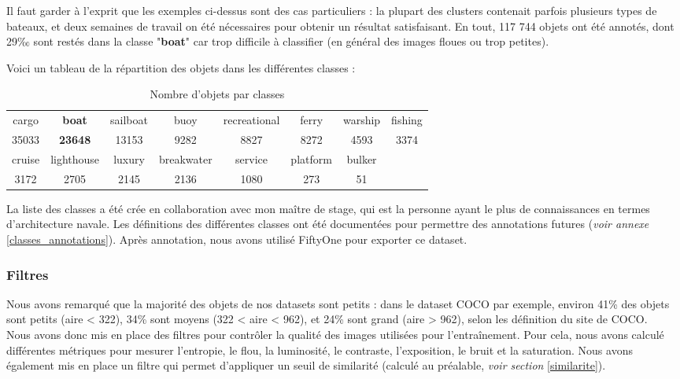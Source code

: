 Il faut garder à l'exprit que les exemples ci-dessus sont des cas particuliers : la plupart des
clusters contenait parfois plusieurs types de bateaux, et deux semaines de travail on été nécessaires
pour obtenir un résultat satisfaisant. En tout, 117 744 objets ont été annotés, dont 29‰ sont restés
dans la classe "\textbf{boat}" car trop difficile à classifier (en général des images floues ou trop petites).

Voici un tableau de la répartition des objets dans les différentes classes : \\

\begin{table}[!h]
    \caption{Nombre d'objets par classes}
    \begin{center}
    \begin{tabular}{c c c c c c c c}
    \hline
    cargo & \textbf{boat} & sailboat & buoy & recreational & ferry & warship & fishing \\
    35033 & \textbf{23648} & 13153 & 9282 & 8827 & 8272 & 4593 & 3374 \\

    \hline
    cruise & lighthouse & luxury & breakwater & service & platform & bulker \\
    3172 & 2705 & 2145 & 2136 & 1080 & 273 & 51
    \end{tabular}
    \end{center}
\end{table}

La liste des classes a été crée en collaboration avec mon maître de stage, qui est la personne ayant le plus de connaissances en termes d'architecture navale. 
Les définitions des différentes classes ont été documentées pour permettre
des annotations futures (\textit{voir annexe }\ref{classes_annotations}).
Après annotation, nous avons utilisé FiftyOne pour exporter ce dataset.

\subsubsection{Filtres}

Nous avons remarqué que la majorité des objets de nos datasets sont petits :
dans le dataset COCO par exemple, environ 41\% des objets sont petits (aire < 322),
34\% sont moyens (322 < aire < 962), et 24\% sont grand (aire > 962), selon
les définition du site de COCO.\\

Nous avons donc mis en place des filtres pour contrôler la qualité des images
utilisées pour l'entraînement. Pour cela, nous avons calculé différentes métriques
pour mesurer l'entropie, le flou, la luminosité, le contraste, l'exposition, le bruit et
la saturation. Nous avons également mis en place un filtre qui permet d'appliquer un seuil
de similarité (calculé au préalable, \textit{voir section }\ref{similarite}).\\

